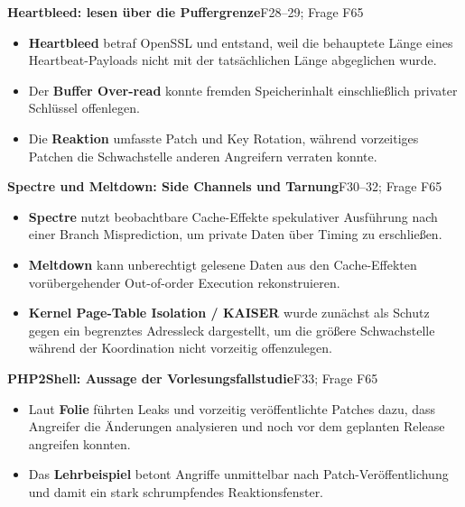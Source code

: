 \documentclass[11pt,a4paper]{article}
\newcommand{\block}[2]{\par\vspace{5pt}\textbf{#1}\hfill{\scriptsize #2}\par\nopagebreak}
\begin{document}
\block{Heartbleed: lesen über die Puffergrenze}{F28--29; Frage F65}
\begin{itemize}
\item \textbf{Heartbleed} betraf OpenSSL und entstand, weil die behauptete Länge eines Heartbeat-Payloads nicht mit der tatsächlichen Länge abgeglichen wurde.
\item Der \textbf{Buffer Over-read} konnte fremden Speicherinhalt einschließlich privater Schlüssel offenlegen.
\item Die \textbf{Reaktion} umfasste Patch und Key Rotation, während vorzeitiges Patchen die Schwachstelle anderen Angreifern verraten konnte.
\end{itemize}
\block{Spectre und Meltdown: Side Channels und Tarnung}{F30--32; Frage F65}
\begin{itemize}
\item \textbf{Spectre} nutzt beobachtbare Cache-Effekte spekulativer Ausführung nach einer Branch Misprediction, um private Daten über Timing zu erschließen.
\item \textbf{Meltdown} kann unberechtigt gelesene Daten aus den Cache-Effekten vorübergehender Out-of-order Execution rekonstruieren.
\item \textbf{Kernel Page-Table Isolation / KAISER} wurde zunächst als Schutz gegen ein begrenztes Adressleck dargestellt, um die größere Schwachstelle während der Koordination nicht vorzeitig offenzulegen.
\end{itemize}
\block{PHP2Shell: Aussage der Vorlesungsfallstudie}{F33; Frage F65}
\begin{itemize}
\item Laut \textbf{Folie} führten Leaks und vorzeitig veröffentlichte Patches dazu, dass Angreifer die Änderungen analysieren und noch vor dem geplanten Release angreifen konnten.
\item Das \textbf{Lehrbeispiel} betont Angriffe unmittelbar nach Patch-Veröffentlichung und damit ein stark schrumpfendes Reaktionsfenster.
\end{itemize}

\newpage
\end{document}
